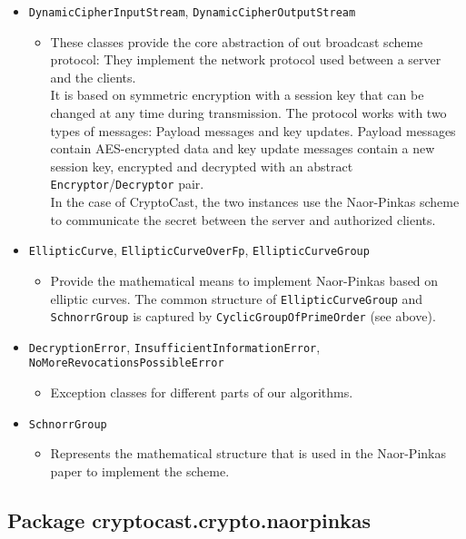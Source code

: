 \documentclass[a4paper,10pt]{scrartcl}
\begin{document}
\begin{itemize}
  \item \lstinline|DynamicCipherInputStream|, \lstinline|DynamicCipherOutputStream|
  \begin{itemize}
   \item These classes provide the core abstraction of out broadcast scheme protocol: They
	 implement the network protocol used between a server and the clients. \\
	 It is based on symmetric encryption with a session key that can be changed at any
	 time during transmission.
	 The protocol works with two types of messages: Payload messages and key updates.
	 Payload messages contain AES-encrypted data and key update messages contain a new session key,
	 encrypted and decrypted with an abstract \lstinline|Encryptor|/\lstinline|Decryptor| pair. \\
	 In the case of CryptoCast, the two instances use the Naor-Pinkas scheme to communicate
	 the secret between the server and authorized clients.
  \end{itemize}

  \item \lstinline|EllipticCurve|, \lstinline|EllipticCurveOverFp|, \lstinline|EllipticCurveGroup|
  \begin{itemize}
   \item Provide the mathematical means to implement Naor-Pinkas based on elliptic curves.
	 The common structure of \lstinline|EllipticCurveGroup| and \lstinline|SchnorrGroup| is
	 captured by  \lstinline|CyclicGroupOfPrimeOrder| (see above).
  \end{itemize}

   \item \lstinline|DecryptionError|, \lstinline|InsufficientInformationError|, \lstinline|NoMoreRevocationsPossibleError|
  \begin{itemize}
   \item Exception classes for different parts of our algorithms.
  \end{itemize}

  \item \lstinline|SchnorrGroup|
  \begin{itemize}
   \item Represents the mathematical structure that is used in the Naor-Pinkas paper
	 to implement the scheme.
  \end{itemize}

\end{itemize}

\subsection{Package cryptocast.crypto.naorpinkas}
\end{document}
